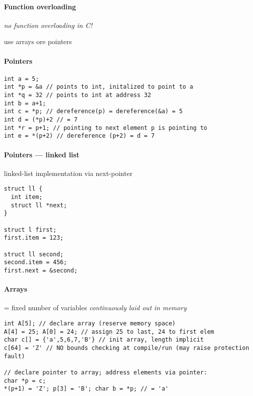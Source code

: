 \paragraph{Function overloading}
\begin{items}
  \item \emph{no function overloading in C!}
  \item use arrays ore pointers
\end{items}

\paragraph{Pointers}
\begin{lstlisting}[style=customc]
int a = 5;
int *p = &a // points to int, initalized to point to a
int *q = 32 // points to int at address 32
int b = a+1;
int c = *p; // dereference(p) = dereference(&a) = 5
int d = (*p)+2 // = 7
int *r = p+1; // pointing to next element p is pointing to
int e = *(p+2) // dereference (p+2) = d = 7
\end{lstlisting}

\paragraph{Pointers --- linked list}
\begin{items}
  \item linked-list implementation via next-pointer
\end{items}
\begin{lstlisting}[style=customc]
struct ll {
  int item;
  struct ll *next;
}

struct l first;
first.item = 123;

struct ll second;
second.item = 456;
first.next = &second;
\end{lstlisting}

\paragraph{Arrays}
\begin{items}
  \item = fixed number of variables \emph{continuously laid out in memory}
\end{items}
\begin{lstlisting}[style=customc]
int A[5]; // declare array (reserve memory space)
A[4] = 25; A[0] = 24; // assign 25 to last, 24 to first elem
char c[] = {'a',5,6,7,'B'} // init array, length implicit
c[64] = 'Z' // NO bounds checking at compile/run (may raise protection fault)

// declare pointer to array; address elements via pointer:
char *p = c;
*(p+1) = 'Z'; p[3] = 'B'; char b = *p; // = 'a'
\end{lstlisting}

